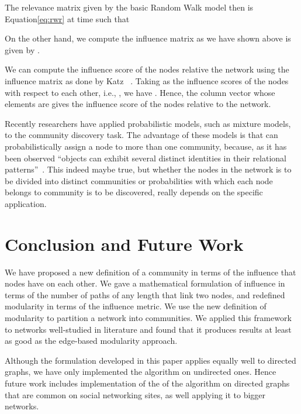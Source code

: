 \documentclass{sig-alternate}
\begin{document}
The relevance matrix  given by the basic Random Walk model then is Equation\eqref{eq:rwr} at time  such that

On the other hand, we compute the influence matrix   as we have shown above is given by
.

We can compute the  influence score of the nodes relative the network  using  the influence matrix as done by Katz ~\cite{Katz}. Taking  as the influence scores of the nodes with respect to each other, i.e., , we have . Hence, the column vector  whose elements are  gives the influence score of the nodes relative to the network.




Recently researchers have applied probabilistic models, such as mixture models, to the community discovery task. The advantage of these models is that can probabilistically assign a node to more than one community, because, as it has been observed ``objects can exhibit several distinct identities in their relational patterns''~\cite{Airoldi,tina}. This indeed maybe true, but whether the nodes in the network is to be divided into distinct communities or probabilities with which each node belongs to  community is to be discovered, really depends on the specific application. 



\section{Conclusion and Future Work}
\label{sec:conclusion}
We have proposed a new definition of a community in terms of the influence that nodes have on each other. We gave a mathematical formulation of influence in terms of the number of paths of any length that link two nodes, and redefined modularity in terms of the influence metric. We use the new definition of modularity to partition a network into communities. We applied this framework to networks well-studied in literature and found that it produces results at least as good as the edge-based modularity approach.


Although the formulation developed in this paper applies equally well to directed graphs, we have only implemented the algorithm on undirected ones. Hence future work includes implementation of the of the algorithm on directed graphs that are common on social networking sites, as well applying it to bigger networks.
\end{document}
